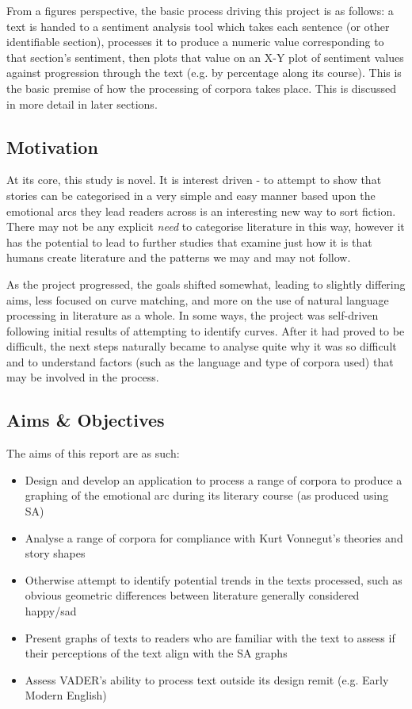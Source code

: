 \documentclass{article}
\begin{document}
{        From a figures perspective, the basic process driving this project is as follows: a text is handed to a sentiment analysis tool which takes each sentence (or other identifiable section), processes it to produce a numeric value corresponding to that section's sentiment, then plots that value on an X-Y plot of sentiment values against progression through the text (e.g. by percentage along its course). This is the basic premise of how the processing of corpora takes place. This is discussed in more detail in later sections.
    \subsection{Motivation}
        At its core, this study is novel. It is interest driven - to attempt to show that stories can be categorised in a very simple and easy manner based upon the emotional arcs they lead readers across is an interesting new way to sort fiction. There may not be any explicit \textit{need} to categorise literature in this way, however it has the potential to lead to further studies that examine just how it is that humans create literature and the patterns we may and may not follow.

        As the project progressed, the goals shifted somewhat, leading to slightly differing aims, less focused on curve matching, and more on the use of natural language processing in literature as a whole. In some ways, the project was self-driven following initial results of attempting to identify curves. After it had proved to be difficult, the next steps naturally became to analyse quite why it was so difficult and to understand factors (such as the language and type of corpora used) that may be involved in the process.
    \subsection{Aims \& Objectives}
        The aims of this report are as such:
        \begin{itemize}
            \item Design and develop an application to process a range of corpora to produce a graphing of the emotional arc during its literary course (as produced using SA)
            \item Analyse a range of corpora for compliance with Kurt Vonnegut’s theories and story shapes
            \item Otherwise attempt to identify potential trends in the texts processed, such as obvious geometric differences between literature generally considered happy/sad
            \item Present graphs of texts to readers who are familiar with the text to assess if their perceptions of the text align with the SA graphs
            \item Assess VADER's ability to process text outside its design remit (e.g. Early Modern English)
        \end{itemize}
}
\end{document}
